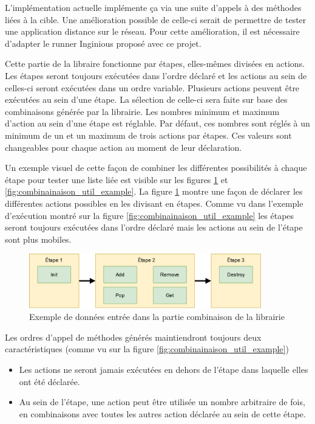 \documentclass[a4paper]{report}
\begin{document}
L'implémentation actuelle implémente ça via une suite d'appels à des méthodes liées à la cible.
Une amélioration possible de celle-ci serait de permettre de tester une application distance sur le réseau.
Pour cette amélioration, il est nécessaire d'adapter le runner Inginious proposé avec ce projet.

Cette partie de la libraire fonctionne par étapes, elles-mêmes divisées en actions.
Les étapes seront toujours exécutées dans l'ordre déclaré et les actions au sein de celles-ci seront exécutées dans un ordre variable.
Plusieurs actions peuvent être exécutées au sein d'une étape.
La sélection de celle-ci sera faite sur base des combinaisons générée par la librairie.
Les nombres minimum et maximum d'action au sein d'une étape est réglable.
Par défaut, ces nombres sont réglés à un minimum de un et un maximum de trois actions par étapes.
Ces valeurs sont changeables pour chaque action au moment de leur déclaration.

Un exemple visuel de cette façon de combiner les différentes possibilités à chaque étape pour tester une liste liée est visible sur les figures \ref{fig:combinainaison_decl_example} et \ref{fig:combinainaison_util_example}.
La figure \ref{fig:combinainaison_decl_example} montre une façon de déclarer les différentes actions possibles en les divisant en étapes.
Comme vu dans l'exemple d'exécution montré sur la figure \ref{fig:combinainaison_util_example} les étapes seront toujours exécutées dans l'ordre déclaré mais les actions au sein de l'étape sont plus mobiles.

\begin{figure}[ht]
	\begin{center}
		\includegraphics[width=0.9\textwidth]{img/combinator_steps_decl.png} 
	\end{center}
	\caption{Exemple de données entrée dans la partie combinaison de la librairie}
	\label{fig:combinainaison_decl_example}
\end{figure}

Les ordres d'appel de méthodes générés maintiendront toujours deux caractéristiques (comme vu sur la figure \ref{fig:combinainaison_util_example})
\begin{itemize}
\item Les actions ne seront jamais exécutées en dehors de l'étape dans laquelle elles ont été déclarée.
\item Au sein de l'étape, une action peut être utilisée un nombre arbitraire de fois, en combinaisons avec toutes les autres action déclarée au sein de cette étape.
\end{itemize}
\end{document}
